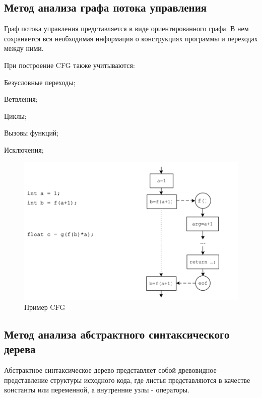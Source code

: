 \subsection{Метод анализа графа потока управления}

Граф потока управления представляется в виде ориентированного графа. В нем сохраняется вся необходимая информация о конструкциях программы и переходах между ними.

При построение CFG также учитываются:
%
\begin{itemize*}
\item Безусловные переходы;
\item Ветвления;
\item Циклы;
\item Вызовы функций;
\item Исключения;
\end{itemize*}
%

\begin{figure}[htbp]
\centering
\includegraphics[width=\textwidth]{fig/cfg_example_1.png}
\caption{Пример CFG}%
\label{fig:cfg_example_1}
\end{figure}

\subsection{Метод анализа абстрактного синтаксического дерева}

Абстрактное синтаксическое дерево представляет собой древовидное представление структуры исходного кода, где листья представляются в качестве константы или переменной, а внутренние узлы - операторы.

